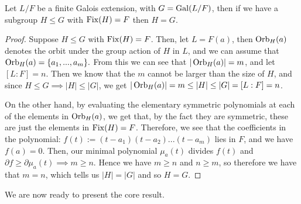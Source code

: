 

\begin{theorem}\label{thm:equal-subgroup-fixed-points}
    Let $L/F$ be a finite Galois extension, with $G=\operatorname{Gal}(L/F)$, then if we have a subgroup $H\leq G$ with $\operatorname{Fix}(H)=F$ then $H=G$.
\end{theorem}

\begin{proof}
    Suppose $H\leq G$ with $\operatorname{Fix}(H)=F$. Then, let $L = F(a)$, then $\operatorname{Orb}_H(a)$ denotes the orbit under the group action of $H$ in $L$, and we can assume that $\operatorname{Orb}_H(a) = \{a_1,...,a_m\}.$ From this we can see that $|\operatorname{Orb}_H(a)| = m$, and let $[L:F]=n$.
    Then we know that the $m$ cannot be larger than the size of $H$, and since $H\leq G \implies |H|\leq|G|$, we get $|\operatorname{Orb}_H(a)| = m \leq |H| \leq |G| = [L:F] = n$.
    
   
    On the other hand, by evaluating the elementary symmetric polynomials at each of the elements in $\operatorname{Orb}_H(a)$, we get that, by the fact they are symmetric, these are just the elements in $\operatorname{Fix}(H)=F$. Therefore, we see that the coefficients in the polynomial: $f(t) := (t-a_1)(t-a_2)...(t-a_m)$ lies in $F$, and we have $f(a)=0$. Then, our minimal polynomial $\mu_a(t)$ divides $f(t)$ and $\partial f \geq \partial \mu_a(t) \implies m \geq n$. Hence we have $m \geq n$ and $n \geq m$, so therefore we have that $m=n$, which tells us $|H|=|G|$ and so $H=G.$
\end{proof}

We are now ready to present the core result.

